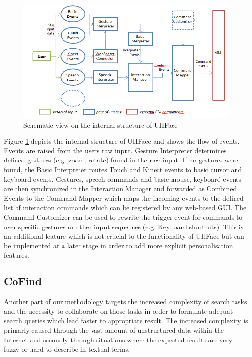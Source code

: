 \documentclass[runningheads,a4paper]{llncs} \usepackage[utf8]{inputenc}
\begin{document}
\begin{figure}[h!]
  \centering
    \includegraphics[width=0.8\linewidth]{resources/uiiface-structure.png}
  \caption{Schematic view on the internal structure of UIIFace}
  \label{fig:uiiface}
\end{figure}

Figure \ref{fig:uiiface} depicts the internal structure of UIIFace and shows the
flow of events. Events are raised from the users raw input. Gesture Interpreter
determines defined gestures (e.g. zoom, rotate) found in the raw input. If no
gestures were found, the Basic Interpreter routes Touch and Kinect events to
basic cursor and keyboard events. Gestures, speech commands and basic mouse,
keyboard events are then synchronized in the Interaction Manager and forwarded
as Combined Events to the Command Mapper which maps the incoming events to the
defined list of interaction commands which can be registered by any web-based
GUI. The Command Customizer can be used to rewrite the trigger event for
commands to user specific gestures or other input sequences (e.g. Keyboard
shortcuts). This is an additional feature which is not crucial to the
functionality of UIIFace but can be implemented at a later stage in order to add
more explicit personalisation features.

\subsection{CoFind}

Another part of our methodology targets the increased complexity of search
tasks and the necessity to collaborate on those tasks in order to formulate
adequat search queries which lead faster to appropriate result. The increased
complexity is primarly caused through the vast amount of unstructured data 
within the Internet and secondly through situations where the expected results
are very fuzzy or hard to describe in textual terms. 
\end{document}
